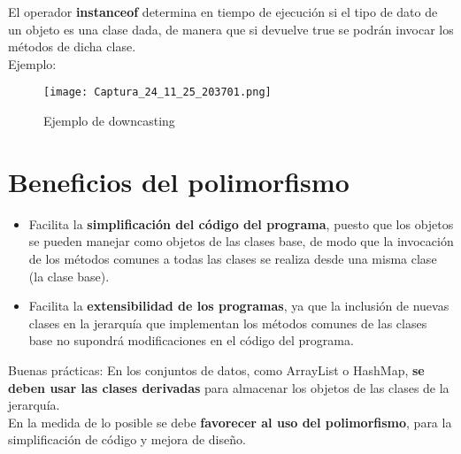 \documentclass{article}
\begin{document}
El operador \textbf{instanceof} determina en tiempo de ejecución si el tipo de dato de un objeto es una clase dada, de manera que si devuelve true se podrán invocar los métodos de dicha clase. \\

Ejemplo:
\begin{figure}[h]
    \centering
    \texttt{[image: Captura\_24\_11\_25\_203701.png]}
    \caption{Ejemplo de downcasting}
\end{figure}

\newpage

\section{Beneficios del polimorfismo}
\begin{itemize}
    \item Facilita la \textbf{simplificación del código del programa}, puesto que los objetos se pueden manejar como objetos de las clases base, de modo que la invocación de los métodos comunes a todas las clases se realiza desde una misma clase (la clase base).
    \item Facilita la \textbf{extensibilidad de los programas}, ya que la inclusión de nuevas clases en la jerarquía que implementan los métodos comunes de las clases base no supondrá modificaciones en el código del programa.
\end{itemize}

Buenas prácticas:
En los conjuntos de datos, como ArrayList o HashMap, \textbf{se deben usar las clases derivadas}
para almacenar los objetos de las clases de la jerarquía. \\
En la medida de lo posible se debe \textbf{favorecer al uso del polimorfismo}, para la simplificación de código y mejora de diseño.


\begin{comment}
\begin{figure}[h]
    \centering
    \texttt{[image: 1.png]}
    \caption{}
\end{figure}
\end{comment}

\begin{comment}
\begin{wrapfigure}[]{r}{0.45\linewidth}
    \centering
    \texttt{[image: 8.png]}
    \caption{Características de los datos}
\end{wrapfigure}
\end{comment}
\end{document}

